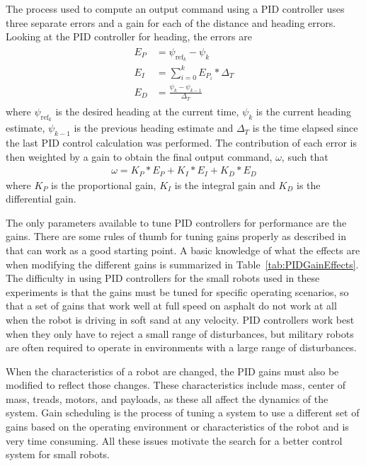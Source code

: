 The process used to compute an output command using a PID controller uses three separate errors and a gain for each of the distance and heading errors. Looking at the PID controller for heading, the errors are
\begin{align*}
\begin{split}
E_P &= \psi_{\text{ref}_k} - \psi_k \\
E_I &= \sum_{i=0}^{k}E_{P_i}*\Delta_T \\
E_D &= \frac{\psi_k - \psi_{k-1}}{\Delta_T}
\end{split}
\end{align*}
where $\psi_{\text{ref}_k}$ is the desired heading at the current time, $\psi_k$ is the current heading estimate, $\psi_{k-1}$ is the previous heading estimate and $\Delta_T$ is the time elapsed since the last PID control calculation was performed. The contribution of each error is then weighted by a gain to obtain the final output command, $\omega$, such that
\begin{align*}
\omega = K_P*E_P + K_I*E_I + K_D*E_D
\end{align*}
where $K_P$ is the proportional gain, $K_I$ is the integral gain and $K_D$ is the differential gain.

The only parameters available to tune PID controllers for performance are the gains. There are some rules of thumb for tuning gains properly as described in~\cite{ZeiglerNichols42} that can work as a good starting point. A basic knowledge of what the effects are when modifying the different gains is summarized in Table~\ref{tab:PIDGainEffects}. The difficulty in using PID controllers for the small robots used in these experiments is that the gains must be tuned for specific operating scenarios, so that a set of gains that work well at full speed on asphalt do not work at all when the robot is driving in soft sand at any velocity. PID controllers work best when they only have to reject a small range of disturbances, but military robots are often required to operate in environments with a large range of disturbances.

When the characteristics of a robot are changed, the PID gains must also be modified to reflect those changes. These characteristics include mass, center of mass, treads, motors, and payloads, as these all affect the dynamics of the system. Gain scheduling is the process of tuning a system to use a different set of gains based on the operating environment or characteristics of the robot and is very time consuming. All these issues motivate the search for a better control system for small robots.

